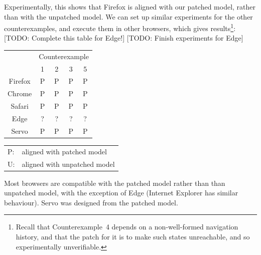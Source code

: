 \documentclass{notes}
\begin{document}
Experimentally, this shows that Firefox is aligned with our patched model, rather than
with the unpatched model. We can set up similar experiments for the other counterexamples,
and execute them in other browsers, which gives results\footnote{%
  Recall that Counterexample~4 depends on a non-well-formed navigation history,
  and that the patch for it is to make such states unreachable, and so
  experimentally unverifiable.
}:
[TODO: Complete this table for Edge!]
[TODO: Finish experiments for Edge]
\begin{center}
 {\sffamily
  \begin{tabular}{ccccc}
    \rowcolor{black!50!blue}
    & \multicolumn{4}{c}{\color{white} Counterexample} \\
    \rowcolor{black!50!blue}
    & \color{white}1 & \color{white}2 & \color{white}3 & \color{white}5 \\
    \rowcolor{white!90!blue}
    Firefox & P  & P  & P  & P \\
    Chrome  & P  & P  & P  & P \\
    \rowcolor{white!90!blue}
    Safari  & P  & P  & P  & P \\
    Edge    & ?  & ?  & ?  & ? \\
    \rowcolor{white!90!blue}
    Servo   & P  & P  & P  & P \\
  \end{tabular}
 }
 \quad
 \begin{tabular}{ll}
   \textsf{P}:& aligned with patched model \\
   \textsf{U}:& aligned with unpatched model \\
 \end{tabular}
\end{center}
Most browsers are compatible with the patched model rather than than
unpatched model, with the exception of Edge (Internet Explorer has similar
behaviour). Servo was designed from the patched model.
\end{document}
